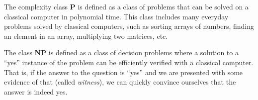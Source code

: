 The complexity class $\mathbf{P}$ is defined as a class of problems that can be solved on a classical computer in polynomial time. This class includes many everyday problems solved by classical computers, such as sorting arrays of numbers, finding an element in an array, multiplying two matrices, etc. 

The class $\mathbf{NP}$ is defined as a class of decision problems where a solution to a ``yes'' instance of the problem can be efficiently verified with a classical computer. That is, if the answer to the question is ``yes'' and we are presented with some evidence of that (called \textit{witness}), we can quickly convince ourselves that the answer is indeed yes.





